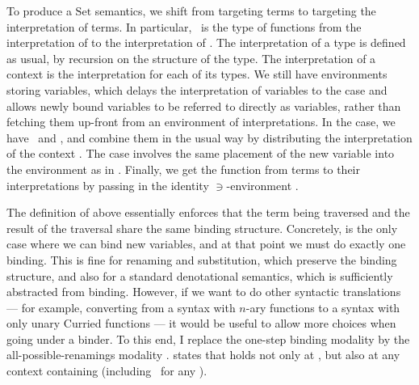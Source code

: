 
To produce a $\mathrm{Set}$ semantics, we shift from targeting terms to
targeting the interpretation of terms.
In particular, \ is the type of functions
from the interpretation of \AgdaBound{$\Gamma$} to the interpretation of
.
The interpretation of a type is defined as usual, by recursion on the structure
of the type.
The interpretation of a context is the interpretation for each of its types.
We still have environments storing variables, which delays the interpretation of
variables to the  case and allows newly
bound variables to be referred to directly as variables, rather than fetching
them up-front from an environment of interpretations.
In the  case, we have
\ and
, and combine them in the usual way
by distributing the interpretation of the context
.
The  case involves the same placement of
the new variable into the environment as in .
Finally, we get the function  from terms to their
interpretations by passing in the identity $\ni$-environment .


The definition of  above essentially enforces that the
term being traversed and the result of the traversal share the same binding
structure.
Concretely,  is the only case where we can bind
new variables, and at that point we must do exactly one binding.
This is fine for renaming and substitution, which preserve the binding
structure, and also for a standard denotational semantics, which is sufficiently
abstracted from binding.
However, if we want to do other syntactic translations --- for example,
converting from a syntax with $n$-ary functions to a syntax with only unary
Curried functions --- it would be useful to allow more choices when going under
a binder.
To this end, I replace the one-step binding modality \AgdaFunction{$\bigcirc$}
by the all-possible-renamings modality \AgdaFunction{$\Box$}.
\AgdaFunction{$\Box$}\AgdaSpace{}\AgdaSpace{}\AgdaBound{$\Gamma$}
states that  holds not only at \AgdaBound{$\Gamma$}, but also at
any context \AgdaBound{$\Gamma^+$} containing \AgdaBound{$\Gamma$} (including
\ for any \AgdaBound{$\Delta$}).

